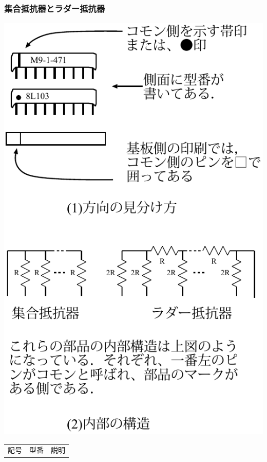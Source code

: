 \documentclass[handout]{beamer}        %
\begin{document}
\begin{frame}
  \frametitle{集合抵抗器とラダー抵抗器}
  \begin{minipage}{0.45\columnwidth}
    \includegraphics[scale=0.56]{../chap3/syuugou.pdf}
  \end{minipage}
  \begin{minipage}{0.54\columnwidth}
    \begin{center}
      {\footnotesize\begin{tabular}{l|l|l}
        \hline
        \hline
        \multicolumn{1}{c|}{記号} &
        \multicolumn{1}{c|}{型番} &
        \multicolumn{1}{c}{説明} \\

\end{tabular}}
\end{center}
\end{minipage}
\end{frame}
\end{document}
